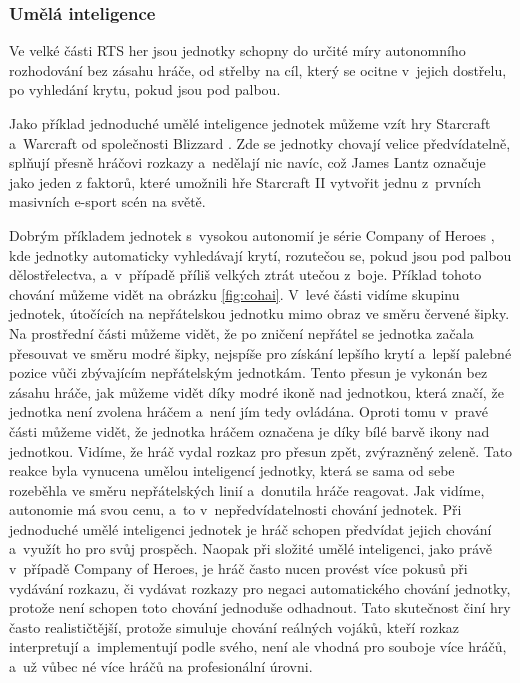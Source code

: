 \subsubsection{Umělá inteligence}

Ve velké části RTS her jsou jednotky schopny do určité míry autonomního rozhodování bez zásahu hráče, od střelby na cíl, který se ocitne v~jejich dostřelu, po vyhledání krytu, pokud jsou pod palbou. 

Jako příklad jednoduché umělé inteligence jednotek můžeme vzít hry Starcraft \citep{site:starcraft} a~Warcraft \citep{site:warcraft3} od společnosti Blizzard \citep{site:blizz}. Zde se jednotky chovají velice předvídatelně, splňují přesně hráčovi rozkazy a~nedělají nic navíc, což James Lantz \citep{site:gamasutra01} označuje jako jeden z faktorů, které umožnili hře Starcraft II vytvořit jednu z~prvních masivních e-sport scén na světě.



Dobrým příkladem jednotek s~vysokou autonomií je série Company of Heroes \citep{site:COH}, kde jednotky automaticky vyhledávají krytí, rozutečou se, pokud jsou pod palbou dělostřelectva, a~v~případě příliš velkých ztrát utečou z~boje. Příklad tohoto chování můžeme vidět na obrázku \ref{fig:cohai}. V~levé části vidíme skupinu jednotek, útočících na nepřátelskou jednotku mimo obraz ve směru červené šipky. Na prostřední části můžeme vidět, že po zničení nepřátel se jednotka začala přesouvat ve směru modré šipky, nejspíše pro získání lepšího krytí a~lepší palebné pozice vůči zbývajícím nepřátelským jednotkám. Tento přesun je vykonán bez zásahu hráče, jak můžeme vidět díky modré ikoně nad jednotkou, která značí, že jednotka není zvolena hráčem a~není jím tedy ovládána. Oproti tomu v~pravé části můžeme vidět, že jednotka hráčem označena je díky bílé barvě ikony nad jednotkou. Vidíme, že hráč vydal rozkaz pro přesun zpět, zvýrazněný zeleně. Tato reakce byla vynucena umělou inteligencí jednotky, která se sama od sebe rozeběhla ve směru nepřátelských linií a~donutila hráče reagovat. Jak vidíme, autonomie má svou cenu, a~to v~nepředvídatelnosti chování jednotek. Při jednoduché umělé inteligenci jednotek je hráč schopen předvídat jejich chování a~využít ho pro svůj prospěch. Naopak při složité umělé inteligenci, jako právě v~případě Company of Heroes, je hráč často nucen provést více pokusů při vydávání rozkazu, či vydávat rozkazy pro negaci automatického chování jednotky, protože není schopen toto chování jednoduše odhadnout. Tato skutečnost činí hry často realističtější, protože simuluje chování reálných vojáků, kteří rozkaz interpretují a~implementují podle svého, není ale vhodná pro souboje více hráčů, a~už vůbec né více hráčů na profesionální úrovni.

